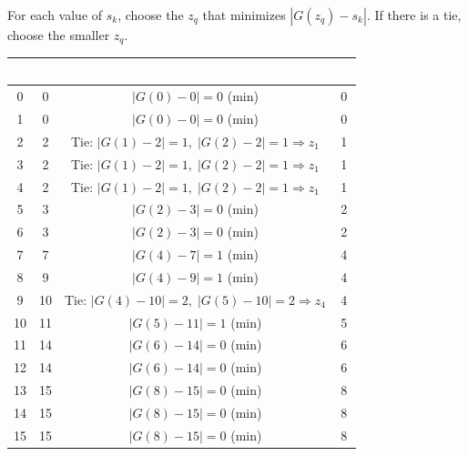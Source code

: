 \documentclass[12pt]{article}
\begin{document}
\begin{stepbox}
For each value of $s_k$, choose the $z_q$ that minimizes $|G(z_q)-s_k|$.
If there is a tie, choose the smaller $z_q$.

\begin{center}
\begin{tabular}{c c c c}
\rowcolor{USC_Garnet!80}
\textcolor{white}{$r_k$} & \textcolor{white}{$s_k$} & \textcolor{white}{Closest match in $G(z_q)$} & \textcolor{white}{$z_q$} \\
\hline
0  & 0  & $|G(0)-0|=0$ (min) & 0 \\
1  & 0  & $|G(0)-0|=0$ (min) & 0 \\
2  & 2  & Tie: $|G(1)-2|=1,\;|G(2)-2|=1 \Rightarrow z_1$ & 1 \\
3  & 2  & Tie: $|G(1)-2|=1,\;|G(2)-2|=1 \Rightarrow z_1$ & 1 \\
4  & 2  & Tie: $|G(1)-2|=1,\;|G(2)-2|=1 \Rightarrow z_1$ & 1 \\
5  & 3  & $|G(2)-3|=0$ (min) & 2 \\
6  & 3  & $|G(2)-3|=0$ (min) & 2 \\
7  & 7  & $|G(4)-7|=1$ (min) & 4 \\
8  & 9  & $|G(4)-9|=1$ (min) & 4 \\
9  & 10 & Tie: $|G(4)-10|=2,\;|G(5)-10|=2 \Rightarrow z_4$ & 4 \\
10 & 11 & $|G(5)-11|=1$ (min) & 5 \\
11 & 14 & $|G(6)-14|=0$ (min) & 6 \\
12 & 14 & $|G(6)-14|=0$ (min) & 6 \\
13 & 15 & $|G(8)-15|=0$ (min) & 8 \\
14 & 15 & $|G(8)-15|=0$ (min) & 8 \\
15 & 15 & $|G(8)-15|=0$ (min) & 8 \\
\hline
\end{tabular}
\end{center}
\end{stepbox}
\end{document}

